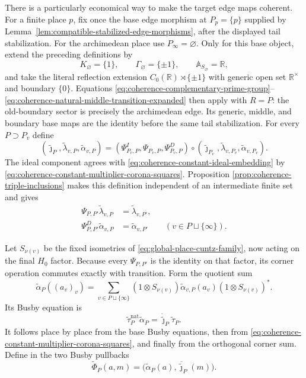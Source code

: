 There is a particularly economical way to make the target edge maps
coherent.  For a finite place $p$, fix once the base edge morphism at
$P_p=\{p\}$ supplied by
Lemma~\ref{lem:compatible-stabilized-edge-morphisms}, after the displayed tail
stabilization.  For the archimedean place use $P_\infty=\varnothing$.  Only
for this base object, extend the preceding definitions by
\[
 K_\varnothing=\{1\},\qquad
 \Gamma_\varnothing=\{\pm1\},\qquad
 \mathbb A_{S_\varnothing}=\mathbb R,
 \]
and take the literal reflection extension
$C_0(\mathbb R)\rtimes\{\pm1\}$ with generic open set
$\mathbb R^\times$ and boundary $\{0\}$.  Equations
\eqref{eq:coherence-complementary-prime-group}--
\eqref{eq:coherence-natural-middle-transition-expanded} then apply with
$R=P$: the old-boundary sector is precisely the archimedean edge.  Its
generic, middle, and boundary base maps are the identity before the same tail
stabilization.  For every
$P\supset P_v$ define
\begin{equation}
 (\widetilde\jmath_P,
  \widetilde\lambda_{v,P},
  \widetilde\alpha_{v,P})
 =
 (\Psi^I_{P_v,P},\Psi_{P_v,P},\Psi^D_{P_v,P})
 \circ
 (\widetilde\jmath_{P_v},
  \widetilde\lambda_{v,P_v},
  \widetilde\alpha_{v,P_v}).
 \label{eq:coherence-placewise-edge-definition}
\end{equation}
The ideal component agrees with
\eqref{eq:coherence-constant-ideal-embedding} by
\eqref{eq:coherence-constant-multiplier-corona-squares}.  Proposition
\ref{prop:coherence-triple-inclusions} makes this definition independent of
an intermediate finite set and gives
\begin{align}
 \Psi_{P,P'}\widetilde\lambda_{v,P}
 &=\widetilde\lambda_{v,P'},
 \label{eq:coherence-placewise-middle-square}\\
 \Psi^D_{P,P'}\widetilde\alpha_{v,P}
 &=\widetilde\alpha_{v,P'}
 \qquad(v\in P\sqcup\{\infty\}).
 \label{eq:coherence-placewise-quotient-square}
\end{align}

Let $S_{\nu(v)}$ be the fixed isometries of
\eqref{eq:global-place-cuntz-family}, now acting on the final $H_0$ factor.
Because every $\Psi_{P,P'}$ is the identity on that factor, its corner
operation commutes exactly with transition.  Form the quotient sum
\begin{equation}
 \widetilde\alpha_P((a_v)_v)
 =\sum_{v\in P\sqcup\{\infty\}}
 (1\otimes S_{\nu(v)})
 \widetilde\alpha_{v,P}(a_v)
 (1\otimes S_{\nu(v)})^*.
 \label{eq:coherence-global-quotient-embedding}
\end{equation}
Its Busby equation is
\begin{equation}
 \widetilde\tau_P^{\mathrm{nat}}\widetilde\alpha_P
 =\dot{\widetilde\jmath}_P\widetilde\tau_P.
 \label{eq:coherence-global-busby-equation}
\end{equation}
It follows place by place from the base Busby equations, then from
\eqref{eq:coherence-constant-multiplier-corona-squares}, and finally from the
orthogonal corner sum.  Define in the two Busby pullbacks
\begin{equation}
 \widetilde\Phi_P(a,m)
 =\bigl(\widetilde\alpha_P(a),
        \overline{\widetilde\jmath}_P(m)\bigr).
 \label{eq:coherence-global-middle-embedding}
\end{equation}

